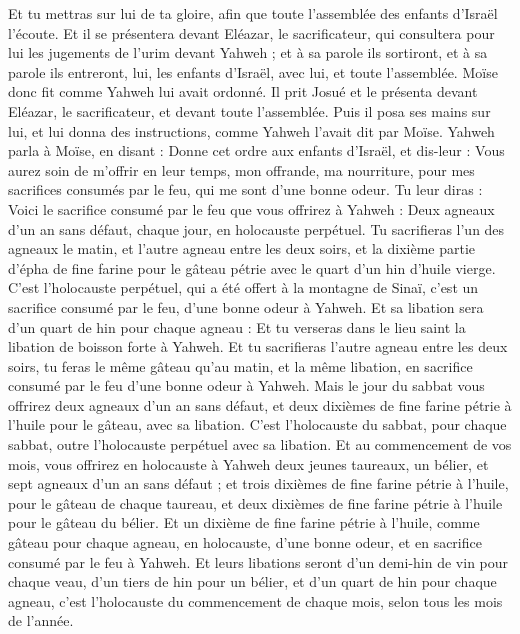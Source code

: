 \begin{multicols}{2}
Et tu mettras sur lui de ta gloire, afin que toute l'assemblée des enfants d'Israël l'écoute.
Et il se présentera devant Eléazar, le sacrificateur, qui consultera pour lui les jugements de l'urim devant Yahweh ; et à sa parole ils sortiront, et à sa parole ils entreront, lui, les enfants d’Israël, avec lui, et toute l’assemblée.
Moïse donc fit comme Yahweh lui avait ordonné. Il prit Josué et le présenta devant Eléazar, le sacrificateur, et devant toute l'assemblée.
Puis il posa ses mains sur lui, et lui donna des instructions, comme Yahweh l'avait dit par Moïse.
\VerseOne{}Yahweh parla à Moïse, en disant :
Donne cet ordre aux enfants d'Israël, et dis-leur : Vous aurez soin de m'offrir en leur temps, mon offrande, ma nourriture, pour mes sacrifices consumés par le feu, qui me sont d'une bonne odeur.
Tu leur diras : Voici le sacrifice consumé par le feu que vous offrirez à Yahweh : Deux agneaux d'un an sans défaut, chaque jour, en holocauste perpétuel.
Tu sacrifieras l'un des agneaux le matin, et l'autre agneau entre les deux soirs,
et la dixième partie d'épha de fine farine pour le gâteau pétrie avec le quart d'un hin d'huile vierge.
C'est l'holocauste perpétuel, qui a été offert à la montagne de Sinaï, c'est un sacrifice consumé par le feu, d'une bonne odeur à Yahweh.
Et sa libation sera d'un quart de hin pour chaque agneau : Et tu verseras dans le lieu saint la libation de boisson forte à Yahweh.
Et tu sacrifieras l’autre agneau entre les deux soirs, tu feras le même gâteau qu'au matin, et la même libation, en sacrifice consumé par le feu d'une bonne odeur à Yahweh.
Mais le jour du sabbat vous offrirez deux agneaux d'un an sans défaut, et deux dixièmes de fine farine pétrie à l'huile pour le gâteau, avec sa libation.
C'est l'holocauste du sabbat, pour chaque sabbat, outre l'holocauste perpétuel avec sa libation.
Et au commencement de vos mois, vous offrirez en holocauste à Yahweh deux jeunes taureaux, un bélier, et sept agneaux d'un an sans défaut ;
et trois dixièmes de fine farine pétrie à l'huile, pour le gâteau de chaque taureau, et deux dixièmes de fine farine pétrie à l'huile pour le gâteau du bélier.
Et un dixième de fine farine pétrie à l'huile, comme gâteau pour chaque agneau, en holocauste, d'une bonne odeur, et en sacrifice consumé par le feu à Yahweh.
Et leurs libations seront d'un demi-hin de vin pour chaque veau, d'un tiers de hin pour un bélier, et d'un quart de hin pour chaque agneau, c'est l'holocauste du commencement de chaque mois, selon tous les mois de l'année.

\end{multicols}
